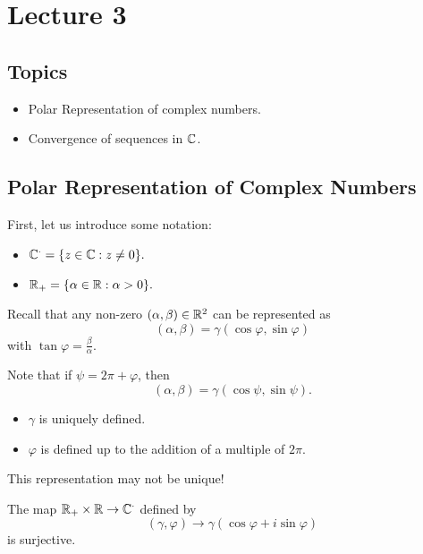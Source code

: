 \documentclass[a4paper]{report}
\begin{document}
\section{Lecture 3}

\subsection{Topics}

\begin{itemize}
    \item Polar Representation of complex numbers.
    \item Convergence of sequences in \( \mathbb{C}  \).
\end{itemize}

\subsection{Polar Representation of Complex Numbers}

First, let us introduce some notation:
\begin{itemize}
    \item \( \mathbb{C}^{\cdot} = \{ z \in \mathbb{C} : z \neq 0  \}. \)
    \item \( {\mathbb{R}}_{+} = \{ \alpha \in \mathbb{R} : \alpha > 0  \}. \)
\end{itemize}

Recall that any non-zero \( (\alpha , \beta ) \in \mathbb{R}^{2} \) can be represented as 
\[  (\alpha, \beta) = \gamma (\cos \varphi, \sin \varphi) \]
with \( \tan \varphi = \frac{ \beta  }{ \alpha }\).

Note that if \( \psi = 2 \pi + \varphi  \), then
\[  (\alpha , \beta ) = \gamma (\cos \psi , \sin \psi). \]

\begin{itemize}
    \item \( \gamma  \) is uniquely defined. 
    \item \( \varphi  \) is defined up to the addition of a multiple of \( 2 \pi  \).
\end{itemize}


\begin{remark}
    This representation may not be unique!
\end{remark}

\begin{prop}
   The map \( {\mathbb{R}}_{+} \times \mathbb{R} \to \mathbb{C}^{\cdot} \) defined by  
   \[  (\gamma, \varphi) \longrightarrow \gamma (\cos \varphi + i \sin \varphi ) \]
   is surjective.
\end{prop}
\end{document}
